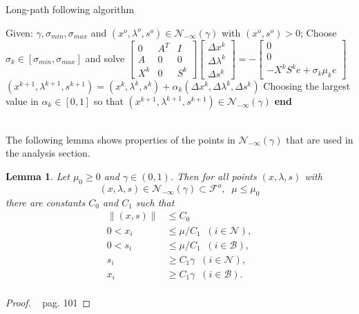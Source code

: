 \documentclass[a4paper,10 pt,titlepage,twoside]{book}
\theoremstyle{plain}
\newtheorem{lem}[thm]{Lemma}
\theoremstyle{definition}
\theoremstyle{remark}
\begin{document}
\begin{algorithm}
	\caption{Long-path following algorithm}
	\begin{algorithmic}[1]		
		\State Given: $\gamma, \sigma_{min}, \sigma_{max}$ and $(x^{o}, \lambda^{o}, s^{o})\in\mathcal{N}_{-\infty}(\gamma)$ with $(x^{o}, s^{o})>0$;
		\State Choose $\sigma_{k}\in[\sigma_{min},\sigma_{max}]$ and solve
		\State $\begin{bmatrix}
			0&A^{T}&I \\A&0&0\\X^{k}&0&S^{k}
			\end{bmatrix}\begin{bmatrix}
			\Delta x^{k}\\\Delta\lambda^{k} \\\Delta s^{k}
			\end{bmatrix}=-\begin{bmatrix}
			0\\0\\-X^{k}S^{k}e + \sigma_{k}\mu_{k}e
			\end{bmatrix}$
		\State $(x^{k+1}, \lambda^{k+1}, s^{k+1}) = (x^{k}, \lambda^{k}, s^{k})+ \alpha_{k}(\Delta x^{k}, \Delta\lambda^{k}, \Delta s^{k})$
		\State Choosing the largest value in $\alpha_{k}\in[0,1]$ so that $(x^{k+1}, \lambda^{k+1}, s^{k+1})\in\mathcal{N}_{-\infty}(\gamma)$	
\textbf{end}
	\end{algorithmic}
\end{algorithm}\\
The following lemma shows properties of the points in $\mathcal{N}_{-\infty}(\gamma)$ that are used in the analysis section.
\begin{lem}
	Let $\mu_{0}\geq 0$ and $\gamma\in(0,1)$. Then for all points $(x,\lambda,s)$ with
	\begin{equation*}
	(x,\lambda,s)\in\mathcal{N}_{-\infty}(\gamma)\subset\mathcal{F}^{o}, \;\; \mu \leq \mu_{0}
	\end{equation*}
	there are constants $C_{0}$ and $C_{1}$ such that
\begin{align*}
\lVert(x,s) \rVert&\leq C_{0}\\0< x_{i}&\leq \mu/C_{1}\;\; (i \in\mathcal{N}),\\
0< s_{i}&\leq \mu/C_{1}\;\; (i \in\mathcal{B}),\\ 
s_{i}&\geq C_{1}\gamma \;\; (i \in\mathcal{N}),\\
x_{i}&\geq C_{1}\gamma \;\; (i \in\mathcal{B}).\\
\end{align*}
\end{lem}
\begin{proof}
~\cite{Wright} pag. 101
\end{proof}
\newpage
\end{document}
